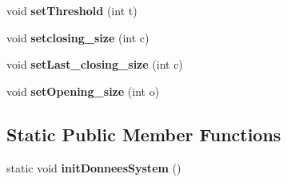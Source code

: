 \begin{DoxyCompactItemize}
\item 
\hypertarget{classMagicfish_a1bd3820e37d0d37ab1464530fa55286d}{void {\bfseries set\-Threshold} (int t)}\label{classMagicfish_a1bd3820e37d0d37ab1464530fa55286d}

\item 
\hypertarget{classMagicfish_adabdc34e3b24819bdcbaa8982feab371}{void {\bfseries setclosing\-\_\-size} (int c)}\label{classMagicfish_adabdc34e3b24819bdcbaa8982feab371}

\item 
\hypertarget{classMagicfish_ae1bc443abd6c1ca3b0baa41b8839c7cd}{void {\bfseries set\-Last\-\_\-closing\-\_\-size} (int c)}\label{classMagicfish_ae1bc443abd6c1ca3b0baa41b8839c7cd}

\item 
\hypertarget{classMagicfish_a60cac7f487621409afdaa309426a9cce}{void {\bfseries set\-Opening\-\_\-size} (int o)}\label{classMagicfish_a60cac7f487621409afdaa309426a9cce}

\end{DoxyCompactItemize}
\subsection*{Static Public Member Functions}
\begin{DoxyCompactItemize}
\item 
\hypertarget{classMagicfish_aa5d0ccd0ad4828a556b75613b0ac3122}{static void {\bfseries init\-Donnees\-System} ()}\label{classMagicfish_aa5d0ccd0ad4828a556b75613b0ac3122}

\end{DoxyCompactItemize}
